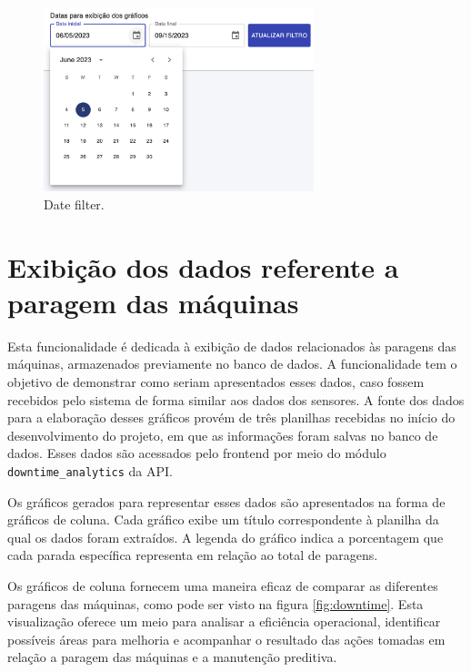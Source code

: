 \begin{figure}[htbp]
	\centering
	\includegraphics[width=0.7\textwidth]{images/datetimeFilter.png}
	\caption{Date filter.}
	\label{fig:loadDataByDate}
\end{figure}

\section[Exibição dos dados referente a paragem das máquinas]{Exibição dos dados referente a paragem das máquinas}\label{sec:downtime}

Esta funcionalidade é dedicada à exibição de dados relacionados às paragens das máquinas, armazenados previamente no banco de dados. A funcionalidade tem o objetivo de demonstrar como seriam apresentados esses dados, caso fossem recebidos pelo sistema de forma similar aos dados dos sensores. A fonte dos dados para a elaboração desses gráficos provém de três planilhas recebidas no início do desenvolvimento do projeto, em que as informações foram salvas no banco de dados. Esses dados são acessados pelo frontend por meio do módulo \texttt{downtime\_analytics} da \gls{API}.

Os gráficos gerados para representar esses dados são apresentados na forma de gráficos de coluna. Cada gráfico exibe um título correspondente à planilha da qual os dados foram extraídos. A legenda do gráfico indica a porcentagem que cada parada específica representa em relação ao total de paragens.

Os gráficos de coluna fornecem uma maneira eficaz de comparar as diferentes paragens das máquinas, como pode ser visto na figura \ref{fig:downtime}. Esta visualização oferece um meio para analisar a eficiência operacional, identificar possíveis áreas para melhoria e acompanhar o resultado das ações tomadas em relação a paragem das máquinas e a manutenção preditiva.

